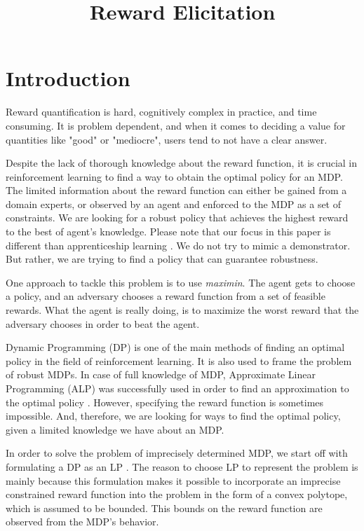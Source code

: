 \documentclass{article}
\title{Reward Elicitation}
\date{}
\theoremstyle{remark}
\theoremstyle{remark}
\theoremstyle{remark}
\theoremstyle{remark}
\theoremstyle{remark}
\theoremstyle{remark}
\begin{document}
\maketitle
\section{Introduction}

Reward quantification is hard, cognitively complex in practice, and time consuming. It is problem dependent, and when it comes to deciding a value for quantities like "good" or "mediocre", users tend to not have a clear answer.


Despite the lack of thorough knowledge about the reward function, it is crucial in reinforcement learning to find a way to obtain the optimal policy for an MDP. The limited information about the reward function can either be gained from a domain experts, or observed by an agent and enforced to the MDP as a set of constraints. We are looking for a robust policy that achieves the highest reward to the best of agent's knowledge. Please note that our focus in this paper is different than apprenticeship learning \cite{abbeel2004}. We do not try to mimic a demonstrator. But rather, we are trying to find a policy that can guarantee robustness.


One approach to tackle this problem is to use \emph{maximin}. The agent gets to choose a policy, and an adversary chooses a reward function from a set of feasible rewards. What the agent is really doing, is to maximize the worst reward that the adversary chooses in order to beat the agent.


Dynamic Programming (DP) is one of the main methods of finding an optimal policy in the field of reinforcement learning. It is also used to frame the problem of robust MDPs. In case of full knowledge of MDP, Approximate Linear Programming (ALP) was successfully used in order to find an approximation to the optimal policy \cite{DeFarias2003}. However, specifying the reward function is sometimes impossible. And, therefore, we are looking for ways to find the optimal policy, given a limited knowledge we have about an MDP.


In order to solve the problem of imprecisely determined MDP, we start off with formulating a DP as an LP \cite{Decision2005c}. The reason to choose LP to represent the problem is mainly because this formulation makes it possible to incorporate an imprecise constrained reward function into the problem in the form of a convex polytope, which is assumed to be bounded. This bounds on the reward function are observed from the MDP's behavior. 
\end{document}
